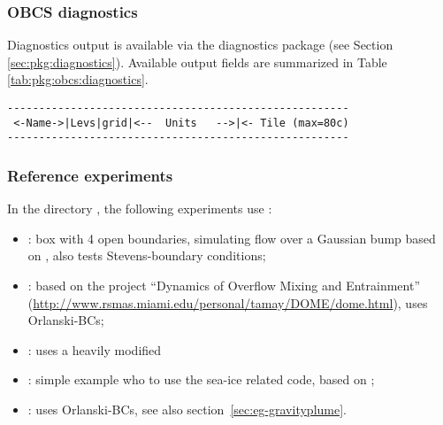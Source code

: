 
\subsubsection{OBCS diagnostics
\label{sec:pkg:obcs:diagnostics}}

Diagnostics output is available via the diagnostics package
(see Section \ref{sec:pkg:diagnostics}).
Available output fields are summarized in 
Table \ref{tab:pkg:obcs:diagnostics}.

\begin{table}[!ht]
\centering
\label{tab:pkg:obcs:diagnostics}
{\footnotesize
\begin{verbatim}
------------------------------------------------------
 <-Name->|Levs|grid|<--  Units   -->|<- Tile (max=80c)
------------------------------------------------------

\end{verbatim}
}
\caption{~}
\end{table}


\subsubsection{Reference experiments}
In the directory , the following experiments use
: 
\begin{itemize}
\item {}: box with 4 open boundaries, simulating flow over a
  Gaussian bump based on \citet{adcroft:97}, also tests
  Stevens-boundary conditions;
\item {}: based on the project ``Dynamics of Overflow Mixing
  and Entrainment''
  (\url{http://www.rsmas.miami.edu/personal/tamay/DOME/dome.html}), uses
  Orlanski-BCs;
\item {}: uses a heavily modified 
\item {}: simple example who to use the sea-ice
  related code, based on ;
\item {}: uses Orlanski-BCs, see also
  section~\ref{sec:eg-gravityplume}.
\end{itemize}




